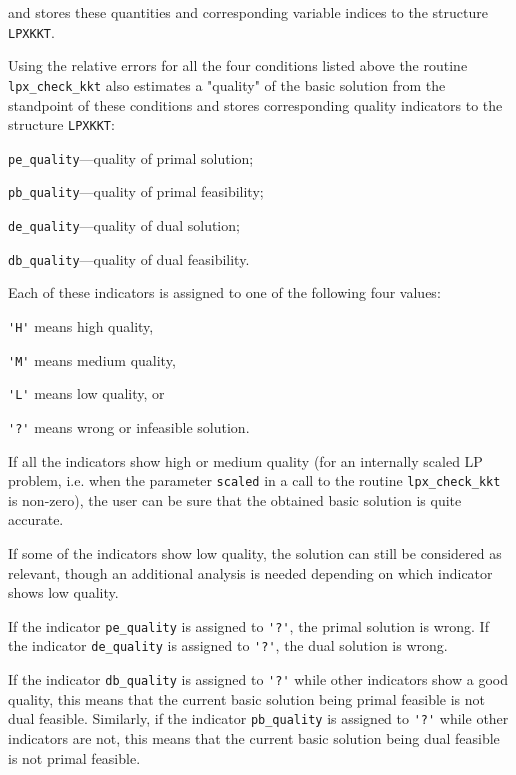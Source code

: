 \noindent
and stores these quantities and corresponding variable indices to the
structure \verb|LPXKKT|.

Using the relative errors for all the four conditions listed above the
routine
\verb|lpx_check_kkt| also estimates a "quality" of the basic solution
from the standpoint of these conditions and stores corresponding
quality indicators to the structure \verb|LPXKKT|:

\verb|pe_quality|---quality of primal solution;

\verb|pb_quality|---quality of primal feasibility;

\verb|de_quality|---quality of dual solution;

\verb|db_quality|---quality of dual feasibility.

Each of these indicators is assigned to one of the following four
values:

\verb|'H'| means high quality,

\verb|'M'| means medium quality,

\verb|'L'| means low quality, or

\verb|'?'| means wrong or infeasible solution.

If all the indicators show high or medium quality (for an internally
scaled LP problem, i.e. when the parameter \verb|scaled| in a call to
the routine \verb|lpx_check_kkt| is non-zero), the user can be sure that
the obtained basic solution is quite accurate.

If some of the indicators show low quality, the solution can still be
considered as relevant, though an additional analysis is needed
depending on which indicator shows low quality.

If the indicator \verb|pe_quality| is assigned to \verb|'?'|, the
primal solution is wrong. If the indicator \verb|de_quality| is assigned
to \verb|'?'|, the dual solution is wrong.

If the indicator \verb|db_quality| is assigned to \verb|'?'| while
other indicators show a good quality, this means that the current
basic solution being primal feasible is not dual feasible. Similarly,
if the indicator \verb|pb_quality| is assigned to \verb|'?'| while
other indicators are not, this means that the current basic solution
being dual feasible is not primal feasible.

